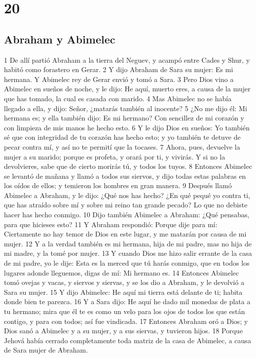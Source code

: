 \chapter{20}

\section{Abraham y Abimelec}

1 De allí partió Abraham a la tierra del Neguev, y acampó entre Cades y Shur, y habitó como forastero en Gerar.
2 Y dijo Abraham de Sara su mujer: Es mi hermana. Y Abimelec rey de Gerar envió y tomó a Sara.
3 Pero Dios vino a Abimelec en sueños de noche, y le dijo: He aquí, muerto eres, a causa de la mujer que has tomado, la cual es casada con marido.
4 Mas Abimelec no se había llegado a ella, y dijo: Señor, ¿matarás también al inocente?
5 ¿No me dijo él: Mi hermana es; y ella también dijo: Es mi hermano? Con sencillez de mi corazón y con limpieza de mis manos he hecho esto.
6 Y le dijo Dios en sueños: Yo también sé que con integridad de tu corazón has hecho esto; y yo también te detuve de pecar contra mí, y así no te permití que la tocases.
7 Ahora, pues, devuelve la mujer a su marido; porque es profeta, y orará por ti, y vivirás. Y si no la devolvieres, sabe que de cierto morirás tú, y todos los tuyos.
8 Entonces Abimelec se levantó de mañana y llamó a todos sus siervos, y dijo todas estas palabras en los oídos de ellos; y temieron los hombres en gran manera.
9 Después llamó Abimelec a Abraham, y le dijo: ¿Qué nos has hecho? ¿En qué pequé yo contra ti, que has atraído sobre mí y sobre mi reino tan grande pecado? Lo que no debiste hacer has hecho conmigo.
10 Dijo también Abimelec a Abraham: ¿Qué pensabas, para que hicieses esto?
11 Y Abraham respondió: Porque dije para mí: Ciertamente no hay temor de Dios en este lugar, y me matarán por causa de mi mujer.
12 Y a la verdad también es mi hermana, hija de mi padre, mas no hija de mi madre, y la tomé por mujer.
13 Y cuando Dios me hizo salir errante de la casa de mi padre, yo le dije: Esta es la merced que tú harás conmigo, que en todos los lugares adonde lleguemos, digas de mí: Mi hermano es.
14 Entonces Abimelec tomó ovejas y vacas, y siervos y siervas, y se los dio a Abraham, y le devolvió a Sara su mujer.
15 Y dijo Abimelec: He aquí mi tierra está delante de ti; habita donde bien te parezca.
16 Y a Sara dijo: He aquí he dado mil monedas de plata a tu hermano; mira que él te es como un velo para los ojos de todos los que están contigo, y para con todos; así fue vindicada.
17 Entonces Abraham oró a Dios; y Dios sanó a Abimelec y a su mujer, y a sus siervas, y tuvieron hijos.
18 Porque Jehová había cerrado completamente toda matriz de la casa de Abimelec, a causa de Sara mujer de Abraham.

